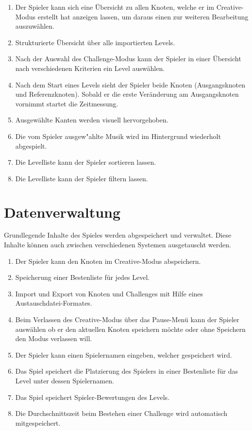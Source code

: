 \begin{enumerate}[resume]

\item Der Spieler kann sich eine Übersicht zu allen Knoten, welche er im Creative-Modus erstellt hat anzeigen lassen, um daraus einen zur weiteren Bearbeitung auszuwählen.
\item Strukturierte Übersicht über alle importierten Levels. %
\item Nach der Auswahl des Challenge-Modus kann der Spieler in einer Übersicht nach verschiedenen Kriterien ein Level auswählen.
\item Nach dem Start eines Levels sieht der Spieler beide Knoten (Ausgangsknoten und Referenzknoten). Sobald er die erste Veränderung am Ausgangsknoten vornimmt startet die Zeitmessung.
\item Ausgewählte Kanten werden visuell hervorgehoben.
\item Die vom Spieler ausgew{"a}hlte Musik wird im Hintergrund wiederholt abgespielt. %
\item Die Levelliste kann der Spieler sortieren lassen. %
\item Die Levelliste kann der Spieler filtern lassen. %

\end{enumerate}
\section{Datenverwaltung}
Grundlegende Inhalte des Spieles werden abgespeichert und verwaltet.
Diese Inhalte können auch zwischen verschiedenen Systemen ausgetauscht werden. 

\begin{enumerate}[resume]

\item Der Spieler kann den Knoten im Creative-Modus abspeichern.
\item Speicherung einer Bestenliste für jedes Level.
\item Import und Export von Knoten und Challenges mit Hilfe eines Austauschdatei-Formates.
\item Beim Verlassen des Creative-Modus über das Pause-Menü  kann der Spieler auswählen ob er den aktuellen Knoten speichern möchte oder ohne Speichern den Modus verlassen will. %
\item Der Spieler kann einen Spielernamen eingeben, welcher gespeichert wird.
\item Das Spiel speichert die Platzierung des Spielers in einer Bestenliste für das Level unter dessen Spielernamen.
\item Das Spiel speichert Spieler-Bewertungen des Levels. %
\item Die Durchschnittszeit beim Bestehen einer Challenge wird automatisch mitgespeichert. %


\end{enumerate}

	
